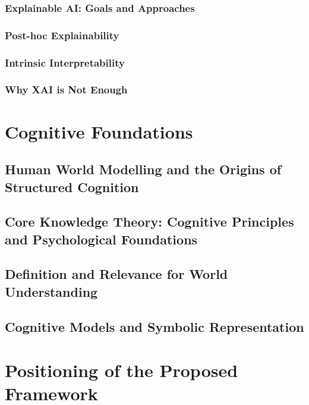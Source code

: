\documentclass[12pt,a4paper]{report}
\begin{document}
\subsubsection{Explainable AI: Goals and Approaches}

\subsubsection{Post-hoc Explainability}

\subsubsection{Intrinsic Interpretability}

\subsubsection{Why XAI is Not Enough}

\section{Cognitive Foundations}

\subsection{Human World Modelling and the Origins of Structured Cognition}

\subsection{Core Knowledge Theory: Cognitive Principles and Psychological Foundations}

\subsection{Definition and Relevance for World Understanding}

\subsection{Cognitive Models and Symbolic Representation}

\section{Positioning of the Proposed Framework}

\end{document}
